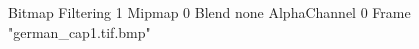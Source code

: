 {Bitmap
	{Filtering 1}
	{Mipmap 0}
	{Blend none}
	{AlphaChannel 0}
	{Frame "german_cap1.tif.bmp"}
}
